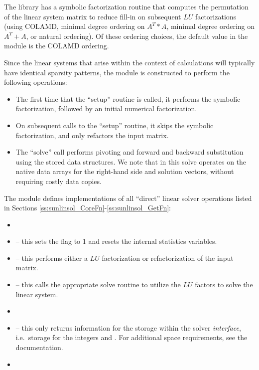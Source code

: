 The {\superlumt} library has a symbolic factorization routine that
computes the permutation of the linear system matrix to reduce fill-in
on subsequent $LU$ factorizations (using COLAMD, minimal degree
ordering on $A^T*A$, minimal degree ordering on $A^T+A$, or natural
ordering).  Of these ordering choices, the default value in the
{\sunlinsolslumt} module is the COLAMD ordering. 

Since the linear systems that arise within the context of {\sundials}
calculations will typically have identical sparsity patterns, the
{\sunlinsolslumt} module is constructed to perform the
following operations:
\begin{itemize}
\item The first time that the ``setup'' routine is called, it
  performs the symbolic factorization, followed by an initial
  numerical factorization.  
\item On subsequent calls to the ``setup'' routine, it skips the
  symbolic factorization, and only refactors the input matrix.
\item The ``solve'' call performs pivoting and forward and
  backward substitution using the stored {\superlumt} data
  structures.  We note that in this solve {\superlumt} operates on the
  native data arrays for the right-hand side and solution vectors,
  without requiring costly data copies.
\end{itemize}



\noindent The {\sunlinsolslumt} module defines implementations of all
``direct'' linear solver operations listed in Sections
\ref{ss:sunlinsol_CoreFn}-\ref{ss:sunlinsol_GetFn}:
\begin{itemize}
\item {}
\item {} -- this sets the
   flag to 1 and resets the internal {\superlumt}
  statistics variables.
\item {} -- this performs either a $LU$
  factorization or refactorization of the input matrix.
\item {} -- this calls the appropriate
  {\superlumt} solve routine to utilize the $LU$ factors to solve the
  linear system. 
\item {}
\item {} -- this only returns information for
  the storage within the solver \emph{interface}, i.e.~storage for the
  integers  and .  For additional
  space requirements, see the {\superlumt} documentation.
\item {}
\end{itemize}
